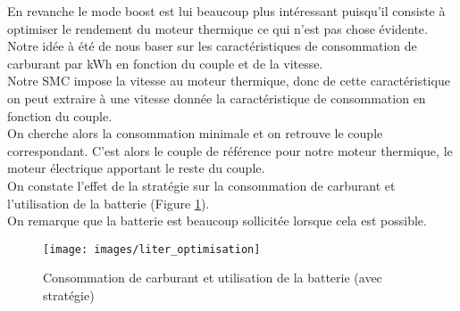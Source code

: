 En revanche le mode boost est lui beaucoup plus intéressant puisqu'il consiste à optimiser le rendement du moteur thermique ce qui n'est pas chose évidente.\\
Notre idée à été de nous baser sur les caractéristiques de consommation de carburant par kWh en fonction du couple et de la vitesse.\\
Notre SMC impose la vitesse au moteur thermique, donc de cette caractéristique on peut extraire à une vitesse donnée la caractéristique de consommation en fonction du couple.\\
On cherche alors la consommation minimale et on retrouve le couple correspondant. C'est alors le couple de référence pour notre moteur thermique, le moteur électrique apportant le reste du couple.\\

On constate l'effet de la stratégie sur la consommation de carburant et l'utilisation de la batterie (Figure \ref{img:liter_optimisation}).\\ On remarque que la batterie est beaucoup sollicitée lorsque cela est possible.\\

\begin{figure}[ht]
\begin{center}
	\texttt{[image: images/liter\_optimisation]}
	\caption{Consommation de carburant et utilisation de la batterie (avec stratégie)}\label{img:liter_optimisation}
\end{center}
\end{figure}
\FloatBarrier